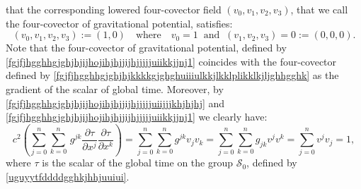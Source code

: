 \documentclass{article}
\theoremstyle{definition}
\theoremstyle{remark}
\newcommand{\er}{\eqref}
\newcommand{\er}{\eqref}
\begin{document}
that the corresponding lowered four-covector field
$(v_0,v_1,v_2,v_3)$, that we call the four-covector of gravitational
potential, satisfies:
\begin{equation}\label{fgjfjhgghhgjghjhjijhojihjhjjijhjjjjjuiikkjjnj1}
(v_0,v_1,v_2,v_3):=\left(1,0\right)\quad\text{where}\quad
v_0=1\;\;\text{and}\;\;(v_1,v_2,v_3)=0:=(0,0,0).
\end{equation}
Note that the four-covector of gravitational potential, defined by
\er{fgjfjhgghhgjghjhjijhojihjhjjijhjjjjjuiikkjjnj1} coincides with
the four-covector defined by
\er{fgjfjhgghhgjghjhjkkkkgjghghuiiiulkkjlkklplikklkjljghhgghk} as
the gradient of the scalar of global time. Moreover, by
\er{fgjfjhgghhgjghjhjijhojihjhjjijhjjjjjuiijjjkhjhjhj} and
\er{fgjfjhgghhgjghjhjijhojihjhjjijhjjjjjuiikkjjnj1} we clearly have:
\begin{equation}\label{fgjfjhgghhgjghjhjijhojihjhjjijhjjjjjuiijjjkhjhjhjuiiuuuyu}
c^2\left(\sum_{j=0}^{n}\sum_{k=0}^{n}\,g^{jk}\frac{\partial\tau}{\partial
x^j}\frac{\partial\tau}{\partial
x^k}\right)=\sum_{j=0}^{n}\sum_{k=0}^{n}g^{jk}v_jv_k=\sum_{j=0}^{n}\sum_{k=0}^{n}g_{jk}v^jv^k=\sum_{j=0}^{n}v^jv_j=1,
\end{equation}
where $\tau$ is the scalar of the global time on the group
$\mathcal{S}_0$, defined by \er{uguyytfddddgghkjhhjuuiui}.
\end{document}
